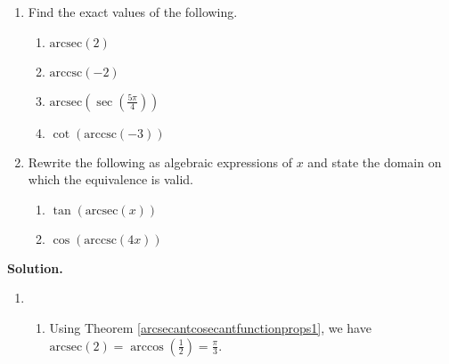 \documentclass[12pt]{ximera}
\begin{document}
\begin{example}  \label{arcsecantcosecantex1} $~$

\begin{enumerate}

\item  Find the exact values of the following.

\begin{multicols}{4}

\begin{enumerate}

\item $\mbox{arcsec}(2)$

\item  $\mbox{arccsc}(-2)$

\item  $\mbox{arcsec}\left( \sec\left( \frac{5\pi}{4} \right) \right)$

\item  $\cot\left(\mbox{arccsc}\left(-3\right)\right)$

\end{enumerate}

\end{multicols}

\item  Rewrite the following as algebraic expressions of $x$ and state the domain on which the equivalence is valid.

\begin{multicols}{2}

\begin{enumerate}

\item  $\tan(\mbox{arcsec}(x))$

\item  $\cos(\mbox{arccsc}(4x))$ 

\end{enumerate}

\end{multicols}

\end{enumerate}



{\bf Solution.}

\begin{enumerate}

\item

\begin{enumerate}

\item Using Theorem \ref{arcsecantcosecantfunctionprops1}, we have $\mbox{arcsec}(2) = \arccos\left(\frac{1}{2}\right) = \frac{\pi}{3}$.


\end{enumerate}
\end{enumerate}
\end{example}
\end{document}
